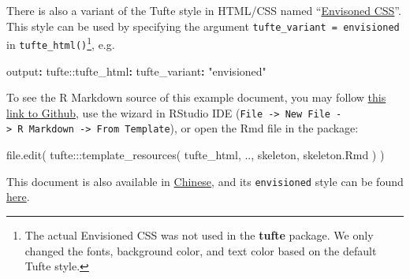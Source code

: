 \documentclass[a4paper,14pt]{tufte-handout}
\newenvironment{Shaded}{}{}
\newcommand{\AttributeTok}[1]{\textcolor[rgb]{0.49,0.56,0.16}{#1}}
\newcommand{\FunctionTok}[1]{\textcolor[rgb]{0.02,0.16,0.49}{#1}}
\newcommand{\KeywordTok}[1]{\textcolor[rgb]{0.00,0.44,0.13}{\textbf{#1}}}
\newcommand{\NormalTok}[1]{#1}
\newcommand{\SpecialCharTok}[1]{\textcolor[rgb]{0.25,0.44,0.63}{#1}}
\newcommand{\StringTok}[1]{\textcolor[rgb]{0.25,0.44,0.63}{#1}}
\begin{document}
There is also a variant of the Tufte style in HTML/CSS named
``\href{https://github.com/nogginfuel/envisioned-css}{Envisoned CSS}''.
This style can be used by specifying the argument
\texttt{tufte\_variant\ =\ \textquotesingle{}envisioned\textquotesingle{}}
in \texttt{tufte\_html()}\footnote{The actual Envisioned CSS was not
  used in the \textbf{tufte} package. We only changed the fonts,
  background color, and text color based on the default Tufte style.},
e.g.

\begin{Shaded}
\begin{Highlighting}[]
\FunctionTok{output}\KeywordTok{:}
\AttributeTok{  tufte:}\FunctionTok{:tufte\_html}\KeywordTok{:}
\AttributeTok{    }\FunctionTok{tufte\_variant}\KeywordTok{:}\AttributeTok{ }\StringTok{"envisioned"}
\end{Highlighting}
\end{Shaded}

To see the R Markdown source of this example document, you may follow
\href{https://github.com/rstudio/tufte/raw/master/inst/rmarkdown/templates/tufte_html/skeleton/skeleton.Rmd}{this
link to Github}, use the wizard in RStudio IDE
(\texttt{File\ -\textgreater{}\ New\ File\ -\textgreater{}\ R\ Markdown\ -\textgreater{}\ From\ Template}),
or open the Rmd file in the package:

\begin{Shaded}
\begin{Highlighting}[numbers=left,,]
\FunctionTok{file.edit}\NormalTok{(}
\NormalTok{  tufte}\SpecialCharTok{:::}\FunctionTok{template\_resources}\NormalTok{(}
    \StringTok{\textquotesingle{}tufte\_html\textquotesingle{}}\NormalTok{, }\StringTok{\textquotesingle{}..\textquotesingle{}}\NormalTok{, }\StringTok{\textquotesingle{}skeleton\textquotesingle{}}\NormalTok{, }\StringTok{\textquotesingle{}skeleton.Rmd\textquotesingle{}}
\NormalTok{  )}
\NormalTok{)}
\end{Highlighting}
\end{Shaded}

This document is also available in
\href{https://rstudio.github.io/tufte/cn/}{Chinese}, and its
\texttt{envisioned} style can be found
\href{https://rstudio.github.io/tufte/envisioned/}{here}.

\newpage


\end{document}

